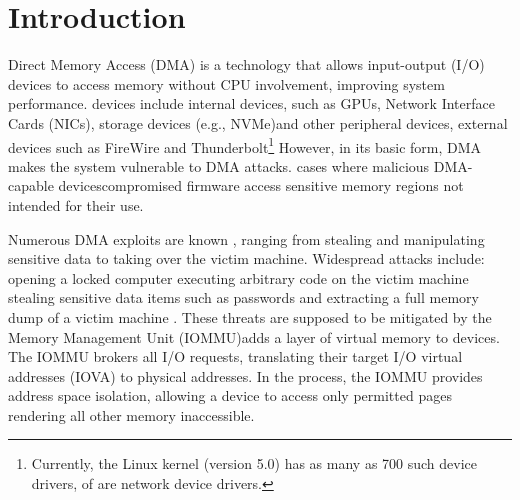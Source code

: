 \section{Introduction}

Direct Memory Access (DMA) is a technology that allows input-output (I/O) devices to access memory without CPU involvement, \DIFaddbegin {}\DIFaddend improving system performance.
\DIFdelbegin {}\DIFdelend \DIFaddbegin {}\DIFaddend devices include internal devices, such as GPUs, Network Interface Cards (NICs), storage devices (e.g., NVMe)\DIFaddbegin \DIFadd{, }\DIFaddend and other peripheral devices, \DIFdelbegin {}\DIFdelend \DIFaddbegin {}\DIFaddend external devices such as FireWire and Thunderbolt\DIFdelbegin {}\DIFdelend \DIFaddbegin {}\DIFaddend \footnote{Currently, the Linux kernel (version 5.0) has as many as 700 such device drivers, \DIFdelbegin {}\DIFdelend of \DIFdelbegin {}\DIFdelend \DIFaddbegin {}\DIFaddend are network device drivers.} However, in its basic form, DMA makes the system vulnerable to DMA attacks. \DIFdelbegin {}\DIFdelend \DIFaddbegin {}\DIFaddend cases where malicious DMA-capable devices\DIFdelbegin {}\DIFdelend \DIFaddbegin {}\DIFaddend compromised firmware \cite{Gal14,Ben17a}\DIFdelbegin \DIFdel{) }\DIFdelend \DIFaddbegin \DIFadd{, }\DIFaddend access sensitive memory regions not intended for their use. 


Numerous DMA exploits are known \cite{Dor04,BDK10,thunder}, ranging from stealing and manipulating sensitive data to taking over the victim machine. Widespread attacks include: opening a locked computer \cite{MM, Fin14}\DIFdelbegin \DIFdel{; }\DIFdelend \DIFaddbegin \DIFadd{, }\DIFaddend executing arbitrary code on the victim machine \cite{Fri16, Woj08, AD10,thunder}\DIFdelbegin \DIFdel{; }\DIFdelend \DIFaddbegin \DIFadd{, }\DIFaddend stealing sensitive data items such as passwords \cite{SB12, LKV13, Cim16, BR12}\DIFdelbegin \DIFdel{; }\DIFdelend \DIFaddbegin \DIFadd{, }\DIFaddend and extracting a full memory dump of a victim machine \cite{MM, Vol, Fin14, GA10}. These threats are supposed to be mitigated by the \DIFdelbegin {}\DIFdelend \DIFaddbegin {}\DIFaddend Memory Management Unit (IOMMU)\DIFdelbegin {}\DIFdelend \DIFaddbegin {}\DIFaddend adds a layer of virtual memory to devices. The IOMMU brokers all I/O requests, translating their target I/O virtual addresses (IOVA) to physical addresses. In the process, the IOMMU provides address space isolation, allowing a device to access only permitted pages \DIFdelbegin \DIFdel{, }\DIFdelend \DIFaddbegin {}\DIFaddend rendering all other memory inaccessible.

